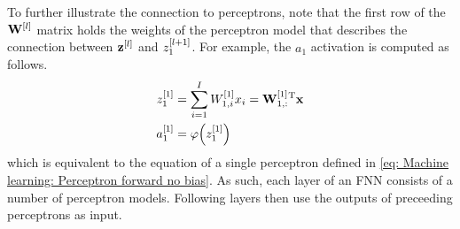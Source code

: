 To further illustrate the connection to perceptrons, note that the first row of the ${\mathbf{W}}^{{\left[l\right]}}$ matrix holds the weights of the perceptron model that describes the connection between ${\mathbf{z}}^{{\left[l\right]}}$ and $z^{{\left[l+1\right]}}_1$. For example, the $a_1$ activation is computed as follows.
\begin{equation}
    \begin{aligned}
        z_1^{\left[1\right]} &= \sum_{i=1}^I W_{1,i}^{{\left[1\right]}} x_i = {\mathbf{W}}_{1,:}^{{\left[1\right]}}{^\mathrm{T}}{\mathbf{x}}\\
        a_1^{\left[1\right]} &= \varphi{\left(z_1^{\left[1\right]}\right)}
    \end{aligned}
\end{equation}
which is equivalent to the equation of a single perceptron defined in \eqref{eq: Machine learning: Perceptron forward no bias}. As such, each layer of an \gls{FNN} consists of a number of perceptron models. Following layers then use the outputs of preceeding perceptrons as input.

